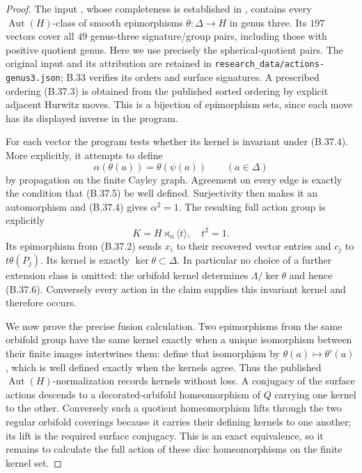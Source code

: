 \begin{proof}
The input \cite{R-KNSData}, whose completeness is established in
\cite[Theorem 2.2, Corollary 2.3, and the planar calculation]{R-KNS},
contains every $\operatorname{Aut}(H)$-class of smooth epimorphisms
$\theta:\Delta\to H$ in genus three.  Its $197$ vectors cover all
$49$ genus-three signature/group pairs, including those with positive
quotient genus.  Here we use precisely the spherical-quotient pairs.
The original input and its attribution are retained in
\texttt{research\_data/actions-genus3.json}; B.33 verifies its orders
and surface signatures.  A prescribed ordering (B.37.3) is obtained
from the published sorted ordering by explicit adjacent Hurwitz
moves.  This is a bijection of epimorphism sets, since each move has
its displayed inverse in the program.

For each vector the program tests whether its kernel is invariant
under (B.37.4).  More explicitly, it attempts to define
\[
              \alpha(\theta(a))=\theta(\psi(a))
                         \qquad(a\in\Delta)             \tag{B.37.5}
\]
by propagation on the finite Cayley graph.  Agreement on every edge
is exactly the condition that (B.37.5) be well defined.  Surjectivity
then makes it an automorphism and (B.37.4) gives $\alpha^2=1$.
The resulting full action group is explicitly
\[
           K=H\rtimes_\alpha\langle t\rangle,
                 \quad t^2=1.                         \tag{B.37.6}
\]
Its epimorphism from (B.37.2) sends $x_i$ to their recovered vector
entries and $c_j$ to $t\theta(P_j)$.  Its kernel is exactly
$\ker\theta\subset\Delta$.  In particular no choice of a further
extension class is omitted: the orbifold kernel determines
$\Lambda/\ker\theta$ and hence (B.37.6).  Conversely every action
in the claim supplies this invariant kernel and therefore occurs.

We now prove the precise fusion calculation.  Two epimorphisms from
the same orbifold group have the same kernel exactly when a unique
isomorphism between their finite images intertwines them: define
that isomorphism by $\theta(a)\mapsto\theta'(a)$, which is well defined
exactly when the kernels agree.  Thus the published
$\operatorname{Aut}(H)$-normalization records kernels without loss.
A conjugacy of the surface actions descends to a decorated-orbifold
homeomorphism of $Q$ carrying one kernel to the other.  Conversely
such a quotient homeomorphism lifts through the two regular
orbifold coverings because it carries their defining kernels to
one another; its lift is the required surface conjugacy.  This is
an exact equivalence, so it remains to calculate the full action of
these disc homeomorphisms on the finite kernel set.


\end{proof}
